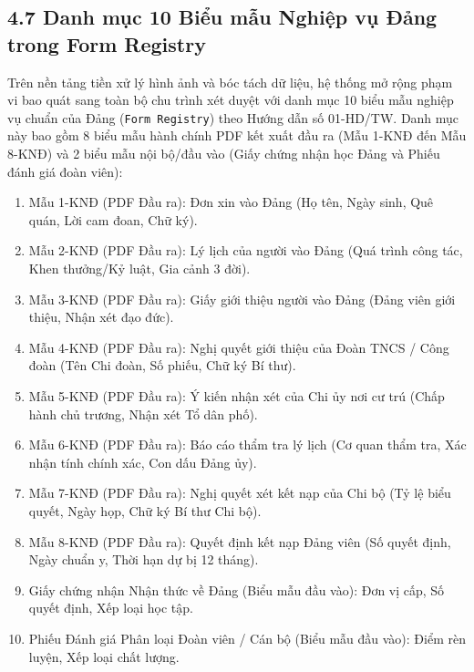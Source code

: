 \documentclass[12pt,a4paper]{report}
\begin{document}
\subsection*{4.7 Danh mục 10 Biểu mẫu Nghiệp vụ Đảng trong Form Registry}
Trên nền tảng tiền xử lý hình ảnh và bóc tách dữ liệu, hệ thống mở rộng phạm vi bao quát sang toàn bộ chu trình xét duyệt với danh mục 10 biểu mẫu nghiệp vụ chuẩn của Đảng (\texttt{Form Registry}) theo Hướng dẫn số 01-HD/TW. Danh mục này bao gồm 8 biểu mẫu hành chính PDF kết xuất đầu ra (Mẫu 1-KNĐ đến Mẫu 8-KNĐ) và 2 biểu mẫu nội bộ/đầu vào (Giấy chứng nhận học Đảng và Phiếu đánh giá đoàn viên):
\begin{enumerate}[label=\arabic*.]
  \item Mẫu 1-KNĐ (PDF Đầu ra): Đơn xin vào Đảng (Họ tên, Ngày sinh, Quê quán, Lời cam đoan, Chữ ký).
  \item Mẫu 2-KNĐ (PDF Đầu ra): Lý lịch của người vào Đảng (Quá trình công tác, Khen thưởng/Kỷ luật, Gia cảnh 3 đời).
  \item Mẫu 3-KNĐ (PDF Đầu ra): Giấy giới thiệu người vào Đảng (Đảng viên giới thiệu, Nhận xét đạo đức).
  \item Mẫu 4-KNĐ (PDF Đầu ra): Nghị quyết giới thiệu của Đoàn TNCS / Công đoàn (Tên Chi đoàn, Số phiếu, Chữ ký Bí thư).
  \item Mẫu 5-KNĐ (PDF Đầu ra): Ý kiến nhận xét của Chi ủy nơi cư trú (Chấp hành chủ trương, Nhận xét Tổ dân phố).
  \item Mẫu 6-KNĐ (PDF Đầu ra): Báo cáo thẩm tra lý lịch (Cơ quan thẩm tra, Xác nhận tính chính xác, Con dấu Đảng ủy).
  \item Mẫu 7-KNĐ (PDF Đầu ra): Nghị quyết xét kết nạp của Chi bộ (Tỷ lệ biểu quyết, Ngày họp, Chữ ký Bí thư Chi bộ).
  \item Mẫu 8-KNĐ (PDF Đầu ra): Quyết định kết nạp Đảng viên (Số quyết định, Ngày chuẩn y, Thời hạn dự bị 12 tháng).
  \item Giấy chứng nhận Nhận thức về Đảng (Biểu mẫu đầu vào): Đơn vị cấp, Số quyết định, Xếp loại học tập.
  \item Phiếu Đánh giá Phân loại Đoàn viên / Cán bộ (Biểu mẫu đầu vào): Điểm rèn luyện, Xếp loại chất lượng.
\end{enumerate}
\end{document}
